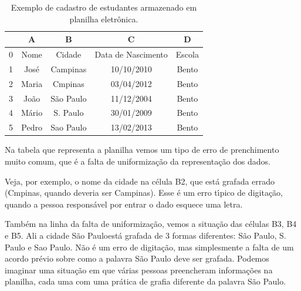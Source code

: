 \documentclass[
12pt,		%
openright,	%
twoside,  %
a4paper,			%
chapter=TITLE,		%
english,			%
french,				%
spanish,			%
brazil				%
]{USPSC-classe/USPSC}
\begin{document}
\begin{table}[htb]
\tiny
\caption{\label{ddd7a335bbc10f88eaaf4abda266d151f0ba0e6f}Exemplo de cadastro de estudantes armazenado em planilha eletr\^onica.}

\centering
\begin{tabular}{|c|c|c|c|c|}
\hline
  &  A  &  B  &  C  &  D  \\
\hline
0 & Nome  &  Cidade  &  Data de Nascimento  &  Escola \\
1 & Jos\'e  &  Campinas  &  10/10/2010  &  Bento \\
2 & Maria  &  Cmpinas  &  03/04/2012  &  Bento \\
3 & Jo\~ao  &  S\~ao Paulo  &  11/12/2004  &  Bento \\
4 & M\'ario  &  S. Paulo  &  30/01/2009  &  Bento \\
5 & Pedro  &  Sao Paulo  &  13/02/2013  &  Bento \\
\hline
\end{tabular}
\end{table}


Na tabela que representa a planilha vemos um tipo de erro de prenchimento muito comum, que \'e a falta de uniformiza\c{c}\~ao da representa\c{c}\~ao dos dados.










Veja, por exemplo, o nome da cidade na c\'elula B2, que est\'a grafada errado (Cmpinas, quando deveria ser Campinas). Esse \'e um erro t\'{\i}pico de digita\c{c}\~ao, quando a pessoa respons\'avel por entrar o dado esquece uma letra.










Tamb\'em na linha da falta de uniformiza\c{c}\~ao, vemos a situa\c{c}\~ao das c\'elulas B3, B4 e B5. Ali a cidade \textquotedbl S\~ao Paulo\textquotedbl  est\'a grafada de 3 formas diferentes: S\~ao Paulo, S. Paulo e Sao Paulo. N\~ao \'e um erro de digita\c{c}\~ao, mas simplesmente a falta de um acordo pr\'evio sobre como a palavra S\~ao Paulo deve ser grafada. Podemos imaginar uma situa\c{c}\~ao em que v\'arias pessoas preencheram informa\c{c}\~oes na planilha, cada uma com uma pr\'atica de grafia diferente da palavra S\~ao Paulo.
\end{document}
